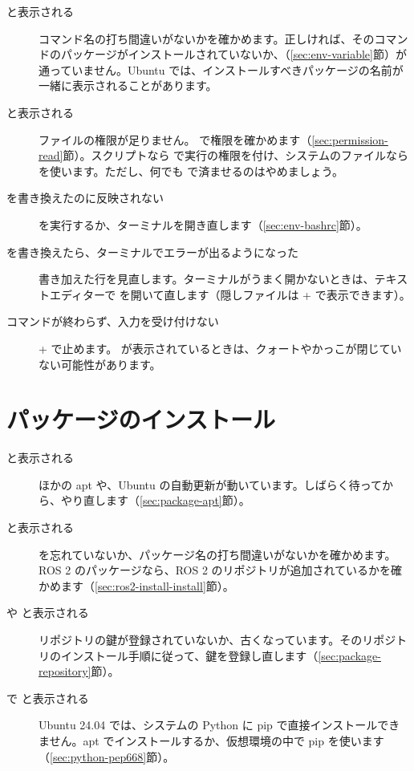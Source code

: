 \begin{description}
  \item[ と表示される] コマンド名の打ち間違いがないかを確かめます。正しければ、そのコマンドのパッケージがインストールされていないか、（\ref{sec:env-variable}節）が通っていません。Ubuntu では、インストールすべきパッケージの名前が一緒に表示されることがあります。
  \item[ と表示される] ファイルの権限が足りません。 で権限を確かめます（\ref{sec:permission-read}節）。スクリプトなら  で実行の権限を付け、システムのファイルなら  を使います。ただし、何でも  で済ませるのはやめましょう。
  \item[ を書き換えたのに反映されない]  を実行するか、ターミナルを開き直します（\ref{sec:env-bashrc}節）。
  \item[ を書き換えたら、ターミナルでエラーが出るようになった] 書き加えた行を見直します。ターミナルがうまく開かないときは、テキストエディターで  を開いて直します（隠しファイルは + で表示できます）。
  \item[コマンドが終わらず、入力を受け付けない] + で止めます。\cmd{>} が表示されているときは、クォートやかっこが閉じていない可能性があります。
\end{description}

\section{パッケージのインストール}
\label{sec:troubleshooting-apt}

\begin{description}
  \item[ と表示される] ほかの apt や、Ubuntu の自動更新が動いています。しばらく待ってから、やり直します（\ref{sec:package-apt}節）。
  \item[ と表示される]  を忘れていないか、パッケージ名の打ち間違いがないかを確かめます。ROS 2 のパッケージなら、ROS 2 のリポジトリが追加されているかを確かめます（\ref{sec:ros2-install-install}節）。
  \item[ や  と表示される] リポジトリの鍵が登録されていないか、古くなっています。そのリポジトリのインストール手順に従って、鍵を登録し直します（\ref{sec:package-repository}節）。
  \item[ で  と表示される] Ubuntu 24.04 では、システムの Python に pip で直接インストールできません。apt でインストールするか、仮想環境の中で pip を使います（\ref{sec:python-pep668}節）。
\end{description}

